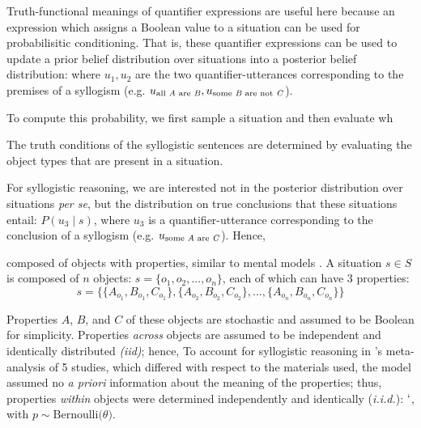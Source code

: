 \documentclass[floatsintext, doc]{apa6}
\begin{document}
Truth-functional meanings of quantifier expressions are useful here because an expression which assigns a Boolean value to a situation can be used for probabilisitic conditioning. That is, these quantifier expressions can be used to update a prior belief distribution over situations into a posterior belief distribution: 
where $u_1, u_2$ are the two quantifier-utterances corresponding to the premises of a syllogism (e.g. $u_{\textrm{all  \emph{A} are \emph{B}}}, u_{\textrm{some  \emph{B} are not \emph{C}}}$).



To compute this probability, we first sample a situation and then evaluate wh




The truth conditions of the syllogistic sentences are determined by evaluating the object types that are present in a situation.


For syllogistic reasoning, we are interested not in the posterior distribution over situations \emph{per se}, but the distribution on true conclusions that these situations entail: $P(u_3 \mid s)$, where $u_3$ is a quantifier-utterance corresponding to the conclusion of a syllogism (e.g. $u_{\textrm{some  \emph{A} are \emph{C}}}$). Hence,







composed of objects with properties, similar to mental models \cite{JL1983}. 
%
A situation $s \in S$ is composed of $n$ objects: $s = \{o_1, o_2, ..., o_n\}$, each of which can have 3 properties:
$$
s = \{ \{A_{o_{1}}, B_{o_{1}} , C_{o_{1}}\},  \{A_{o_{2}}, B_{o_{2}} , C_{o_{2}}\}, ... , \{A_{o_{n}}, B_{o_{n}} , C_{o_{n}}\} \}
$$

Properties $A$, $B$, and $C$ of these objects are stochastic
and assumed to be Boolean for simplicity. 
%
Properties \emph{across} objects are assumed to be independent and identically distributed \emph{(iid)}; hence, 
%
To account for syllogistic reasoning in 's meta-analysis of 5 studies, which differed with respect to the materials used, the model assumed no \emph{a priori} information about the meaning of the properties; thus, properties  \emph{within} objects were determined independently and identically (\emph{i.i.d.}): $`$, with $p \sim \text{Bernoulli(}\theta\text{)}$.
\end{document}
